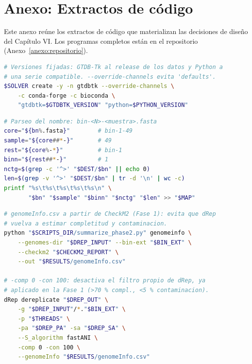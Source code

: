 \section{Anexo: Extractos de código}
\label{anexo:codigo}

Este anexo reúne los extractos de código que materializan las decisiones de
diseño del Capítulo VI. Los programas completos están en el repositorio
(Anexo~\ref{anexo:repositorio}).

\begin{lstlisting}[language=bash, caption={Creación del entorno de GTDB-Tk con
versión de herramienta y de Python fijadas, y canales declarados de forma
explícita (extracto de \texttt{02\_setup\_fase2\_khipu.sh}).},
label={lst:entorno}]
# Versiones fijadas: GTDB-Tk al release de los datos y Python a
# una serie compatible. --override-channels evita 'defaults'.
$SOLVER create -y -n gtdbtk --override-channels \
    -c conda-forge -c bioconda \
    "gtdbtk=$GTDBTK_VERSION" "python=$PYTHON_VERSION"
\end{lstlisting}

\begin{lstlisting}[language=bash, caption={Extracción de la muestra de origen a
partir del nombre de archivo y registro en la tabla de trazabilidad (extracto de
\texttt{01\_prep\_bins.sh}).}, label={lst:trazabilidad}]
# Parseo del nombre: bin-<N>-<muestra>.fasta
core="${bn%.fasta}"        # bin-1-49
sample="${core##*-}"       # 49
rest="${core%-*}"          # bin-1
binn="${rest##*-}"         # 1
nctg=$(grep -c '^>' "$DEST/$bn" || echo 0)
len=$(grep -v '^>' "$DEST/$bn" | tr -d '\n' | wc -c)
printf "%s\t%s\t%s\t%s\t%s\n" \
       "$bn" "$sample" "$binn" "$nctg" "$len" >> "$MAP"
\end{lstlisting}

\begin{lstlisting}[language=bash, caption={Reutilización de la evaluación de
calidad de la Fase 1 y desactivación de los filtros propios de dRep (extracto de
\texttt{run\_fase2.slurm}).}, label={lst:drep}]
# genomeInfo.csv a partir de CheckM2 (Fase 1): evita que dRep
# vuelva a estimar completitud y contaminacion.
python "$SCRIPTS_DIR/summarize_phase2.py" genomeinfo \
    --genomes-dir "$DREP_INPUT" --bin-ext "$BIN_EXT" \
    --checkm2 "$CHECKM2_REPORT" \
    --out "$RESULTS/genomeInfo.csv"

# -comp 0 -con 100: desactiva el filtro propio de dRep, ya
# aplicado en la Fase 1 (>70 % compl., <5 % contaminacion).
dRep dereplicate "$DREP_OUT" \
    -g "$DREP_INPUT"/*."$BIN_EXT" \
    -p "$THREADS" \
    -pa "$DREP_PA" -sa "$DREP_SA" \
    --S_algorithm fastANI \
    -comp 0 -con 100 \
    --genomeInfo "$RESULTS/genomeInfo.csv"
\end{lstlisting}

